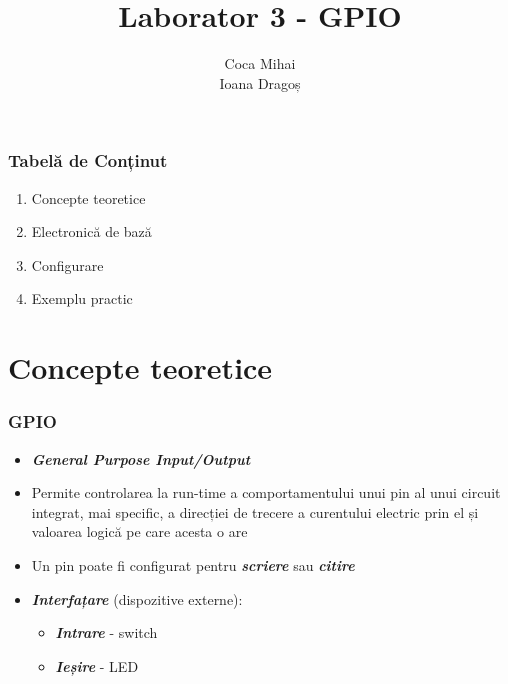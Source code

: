 \documentclass[xcolor={table}]{beamer}
\title{Laborator 3 - GPIO}
\subtitle{}
\author{Coca Mihai \\
        Ioana Dragoș}
\begin{document}
	\setcounter{showProgressBar}{0}
	\setcounter{showSlideNumbers}{0}

	\frame{\titlepage}

	\begin{frame}
		\frametitle{Tabelă de Conținut}
		\begin{enumerate}
            \item Concepte teoretice
			\item Electronică de bază
			\item Configurare
			\item Exemplu practic
		\end{enumerate}
	\end{frame}

	\setcounter{framenumber}{0}
	\setcounter{showProgressBar}{1}
	\setcounter{showSlideNumbers}{1}
	\section{Concepte teoretice}
	\begin{frame}
	    \frametitle{GPIO}
	    \begin{itemize}
	        \item \textbf{\textit{General Purpose Input/Output}}
	        \item Permite controlarea la run-time a comportamentului unui pin al unui circuit integrat, mai specific, a direcției de trecere a curentului electric prin el și valoarea logică pe care acesta o are
	        \item Un pin poate fi configurat pentru \textbf{\textit{scriere}} sau \textbf{\textit{citire}}
	        \item \textbf{\textit{Interfațare}} (dispozitive externe):
	        \begin{itemize}
	            \item \textbf{\textit{Intrare}} - switch
	            \item \textbf{\textit{Ieșire}} - LED
	        \end{itemize}
	        
	        
	    \end{itemize}
	\end{frame}
\end{document}
